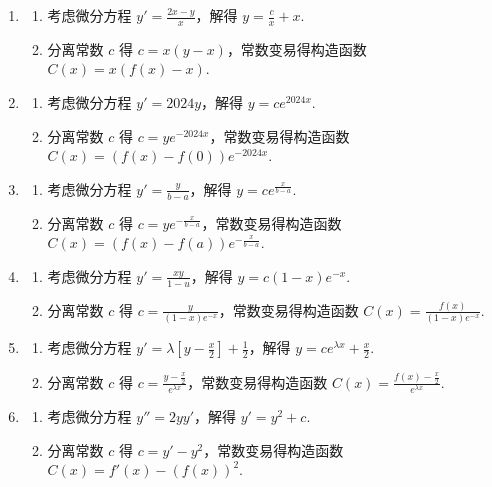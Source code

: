 \documentclass[lang=cn,10pt,thmcnt=section]{elegantbook}
\begin{document}
\begin{remark}
	\begin{enumerate}
		\item %
		\begin{enumerate}[label=\textbf{Step \arabic*}]
			\item 考虑微分方程 $y' = \frac{2x-y}{x}$，解得 $y = \frac{c}{x} + x$.
			\item 分离常数 $c$ 得 $c = x(y-x)$，常数变易得构造函数 $C(x) = x(f(x)-x)$.
		\end{enumerate}
		\item %
		\begin{enumerate}[label=\textbf{Step \arabic*}]
			\item 考虑微分方程 $y' = 2024y$，解得 $y=ce^{2024x}$.
			\item 分离常数 $c$ 得 $c = ye^{-2024x}$，常数变易得构造函数 $C(x) = (f(x) - f(0))e^{-2024x}$.
		\end{enumerate}
		\item %
		\begin{enumerate}[label=\textbf{Step \arabic*}]
			\item 考虑微分方程 $y' = \frac{y}{b-a}$，解得 $y=ce^{\frac{x}{b-a}}$.
			\item 分离常数 $c$ 得 $c = ye^{-\frac{x}{b-a}}$，常数变易得构造函数 $C(x) = (f(x)-f(a))e^{-\frac{x}{b-a}}$.
		\end{enumerate}
		\item %
		\begin{enumerate}[label=\textbf{Step \arabic*}]
			\item 考虑微分方程 $y' = \frac{xy}{1-u}$，解得 $y = c(1-x)e^{-x}$.
			\item 分离常数 $c$ 得 $c = \frac{y}{(1-x)e^{-x}}$，常数变易得构造函数 $C(x) = \frac{f(x)}{(1-x)e^{-x}}$.
		\end{enumerate}
		\item %
		\begin{enumerate}[label=\textbf{Step \arabic*}]
			\item 考虑微分方程 $y' = \lambda \left[y - \frac{x}{2}\right] + \frac{1}{2}$，解得 $y = ce^{\lambda x} + \frac{x}{2}$.
			\item 分离常数 $c$ 得 $c = \frac{y - \frac{x}{2}}{e^{\lambda x}}$，常数变易得构造函数 $C(x) = \frac{f(x) - \frac{x}{2}}{e^{\lambda x}}$.
		\end{enumerate}
		\item %
		\begin{enumerate}[label=\textbf{Step \arabic*}]
			\item 考虑微分方程 $y'' = 2yy'$，解得 $y' = y^2 + c$.
			\item 分离常数 $c$ 得 $c = y' - y^2$，常数变易得构造函数 $C(x) = f'(x) - (f(x))^2$.
		\end{enumerate}
	\end{enumerate}
\end{remark}
\end{document}
